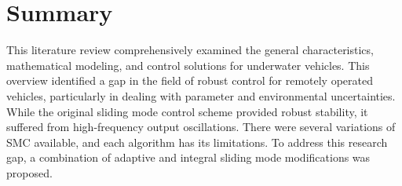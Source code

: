 \section{Summary}

This literature review comprehensively examined the general characteristics, mathematical modeling, 
and control solutions for underwater vehicles. This overview identified a gap in the field of robust 
control for remotely operated vehicles, particularly in dealing with parameter and environmental 
uncertainties. While the original sliding mode control scheme provided robust stability, it suffered 
from high-frequency output oscillations. There were several variations of SMC available, and each 
algorithm has its limitations. To address this research gap, a combination of adaptive and integral 
sliding mode modifications was proposed.